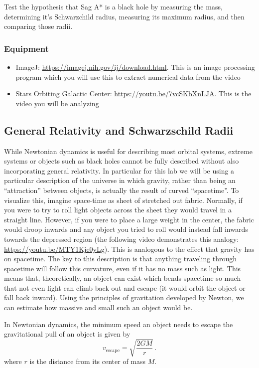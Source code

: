 Test the hypothesis that Sag A* is a black hole by measuring the mass, determining it's Schwarzchild radius, measuring its maximum radius, and then comparing those radii.

\subsubsection{Equipment}
\begin{itemize}
	\item ImageJ: \url{https://imagej.nih.gov/ij/download.html}. This is an image processing program which you will use this to extract numerical data from the video
	\item Stars Orbiting Galactic Center: \url{https://youtu.be/7vcSKbXnLJA}. This is the video you will be analyzing
\end{itemize}

\subsection{General Relativity and Schwarzschild Radii}
While Newtonian dynamics is useful for describing most orbital systems, extreme systems or objects such as black holes cannot be fully described without also incorporating general relativity. In particular for this lab we will be using a particular description of the universe in which gravity, rather than being an ``attraction'' between objects, is actually the result of curved ``spacetime''. To visualize this, imagine space-time as sheet of stretched out fabric. Normally, if you were to try to roll light objects across the sheet they would travel in a straight line. However, if you were to place a large weight in the center, the fabric would droop inwards and any object you tried to roll would instead fall inwards towards the depressed region (the following video demonstrates this analogy: \url{https://youtu.be/MTY1Kje0yLg}). This is analogous to the effect that gravity has on spacetime. The key to this description is that anything traveling through spacetime will follow this curvature, even if it has no mass such as light. This means that, theoretically, an object can exist which bends spacetime so much that not even light can climb back out and escape (it would orbit the object or fall back inward). Using the principles of gravitation developed by Newton, we can estimate how massive and small such an object would be.

In Newtonian dynamics, the minimum speed an object needs to escape the gravitational pull of an object is given by 
\begin{equation}\label{gc:eq:escape-speed}
v_\textrm{escape} = \sqrt{\frac{2 G M}{r}} \,.
\end{equation}
where $r$ is the distance from its center of mass $M$.

